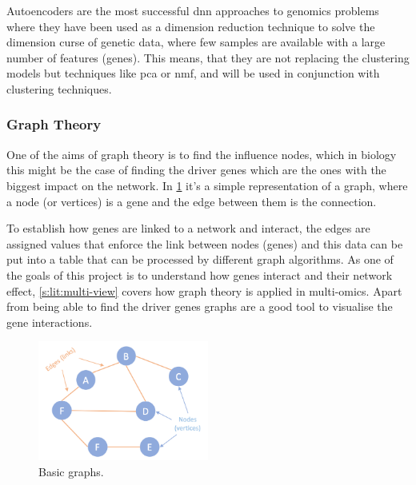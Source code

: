 Autoencoders are the most successful \acrshort{dnn} approaches to genomics problems where they have been used as a dimension reduction technique to solve the dimension curse of genetic data, where few samples are available with a large number of features (genes). This means, that they are not replacing the clustering models but techniques like \acrfull{pca} or \acrfull{nmf}, and will be used in conjunction with clustering techniques.



\subsubsection{Graph Theory} \label{s:lit:graph_overview}

One of the aims of graph theory is to find the influence nodes, which in biology this might be the case of finding the driver genes which are the ones with the biggest impact on the network. In \cref{fig:graphs_basic} it's a simple representation of a graph, where a node (or vertices) is a gene and the edge between them is the connection. 

To establish how genes are linked to a network and interact,  the edges are assigned values that enforce the link between nodes (genes) and this data can be put into a table that can be processed by different graph algorithms. As one of the goals of this project is to understand how genes interact and their network effect, \cref{s:lit:multi-view} covers how graph theory is applied in multi-omics. Apart from being able to find the driver genes graphs are a good tool to visualise the gene interactions. 

\begin{figure}[!htb]
  \centering\includegraphics[width=0.5\textwidth,height=0.5\textheight,keepaspectratio]{Sections/Lit_review/Resources/basic_graphs.png}
    \caption{Basic graphs.}
    \label{fig:graphs_basic}
\end{figure}
\FloatBarrier




